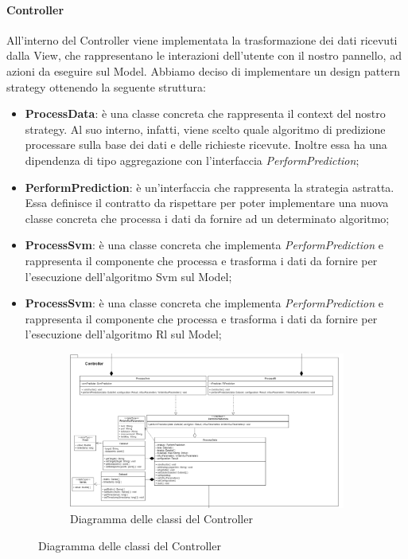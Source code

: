 \paragraph{Controller} \mbox{}
All'interno del Controller viene implementata la trasformazione dei dati ricevuti dalla View, che rappresentano le interazioni dell'utente con il nostro pannello, ad azioni da eseguire sul Model.
Abbiamo deciso di implementare un design pattern strategy ottenendo la seguente struttura:
\begin{itemize}
	\item \textbf{ProcessData}: è una classe concreta che rappresenta il context del nostro strategy. Al suo interno, infatti, viene scelto quale algoritmo di predizione processare sulla base dei dati e delle richieste ricevute. Inoltre essa ha una dipendenza di tipo aggregazione con l'interfaccia \textit{PerformPrediction};
	\item \textbf{PerformPrediction}: è un'interfaccia che rappresenta la strategia astratta. Essa definisce il contratto da rispettare per poter implementare una nuova classe concreta che processa i dati da fornire ad un determinato algoritmo;
	\item \textbf{ProcessSvm}: è una classe concreta che implementa \textit{PerformPrediction} e rappresenta il componente che processa e trasforma i dati da fornire per l'esecuzione dell'algoritmo Svm sul Model;
	\item \textbf{ProcessSvm}: è una classe concreta che implementa \textit{PerformPrediction} e rappresenta il componente che processa e trasforma i dati da fornire per l'esecuzione dell'algoritmo Rl sul Model;
\end{itemize}
\mbox{}
\begin{landscape}
	\begin{figure}
		\begin{figure} [H]
			\includegraphics[width=\linewidth]{./img/Diagrammi/controller-plug-in.png}
			\caption{Diagramma delle classi del Controller}
		\end{figure}
	\end{figure}
\end{landscape}